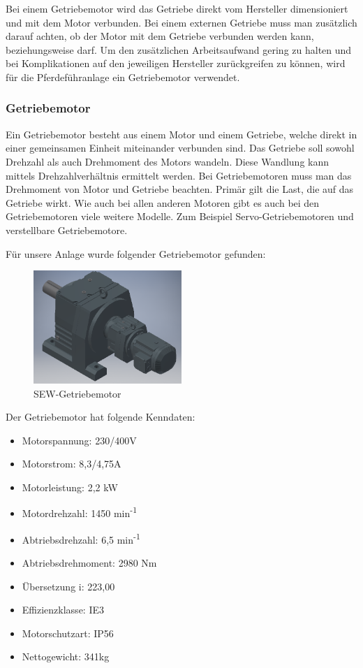 Bei einem Getriebemotor wird das Getriebe direkt vom Hersteller dimensioniert und mit dem Motor verbunden. Bei einem externen Getriebe muss man zusätzlich darauf achten, ob der Motor mit dem Getriebe verbunden werden kann, beziehungsweise darf. Um den zusätzlichen Arbeitsaufwand gering zu halten und bei Komplikationen auf den jeweiligen Hersteller zurückgreifen zu können, wird für die Pferdeführanlage ein Getriebemotor verwendet.

\newpage

\subsubsection{Getriebemotor}
\label{sec:getriebemotor}

Ein Getriebemotor  besteht aus einem Motor und einem Getriebe, welche direkt in einer gemeinsamen Einheit miteinander verbunden sind. Das Getriebe soll sowohl Drehzahl als auch Drehmoment des Motors wandeln. Diese Wandlung kann mittels Drehzahlverhältnis ermittelt werden. Bei Getriebemotoren muss man das Drehmoment von Motor und Getriebe beachten. Primär gilt die Last, die auf das Getriebe wirkt. 
Wie auch bei allen anderen Motoren gibt es auch bei den Getriebemotoren viele weitere Modelle. Zum Beispiel Servo-Getriebemotoren und verstellbare Getriebemotore.

Für unsere Anlage wurde folgender Getriebemotor gefunden:

\begin{figure}[H]
\begin{center}
	\includegraphics[width=0.5\textwidth]{fig/SEWGetriebemotor}
	\caption{SEW-Getriebemotor}
\end{center}
\end{figure}

Der Getriebemotor hat folgende Kenndaten:

\begin{itemize}
	\item{Motorspannung: 230/400V}
	\item{Motorstrom: 8,3/4,75A}
	\item{Motorleistung: 2,2 kW}
	\item{Motordrehzahl: 1450 min\textsuperscript{-1}}
	\item{Abtriebsdrehzahl: 6,5 min\textsuperscript{-1}}
	\item{Abtriebsdrehmoment: 2980 Nm}
	\item{Übersetzung i: 223,00}
	\item{Effizienzklasse: IE3}
	\item{Motorschutzart: IP56}
	\item{Nettogewicht: 341kg}
\end{itemize}

